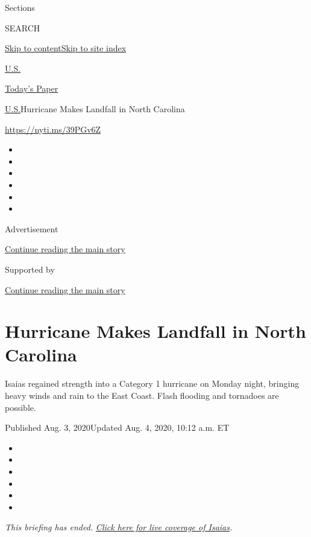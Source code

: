 Sections

SEARCH

\protect\hyperlink{site-content}{Skip to
content}\protect\hyperlink{site-index}{Skip to site index}

\href{https://www.nytimes.com/section/us}{U.S.}

\href{https://myaccount.nytimes.com/auth/login?response_type=cookie\&client_id=vi}{}

\href{https://www.nytimes.com/section/todayspaper}{Today's Paper}

\href{/section/us}{U.S.}\textbar{}Hurricane Makes Landfall in North
Carolina

\url{https://nyti.ms/39PGv6Z}

\begin{itemize}
\item
\item
\item
\item
\item
\item
\end{itemize}

Advertisement

\protect\hyperlink{after-top}{Continue reading the main story}

Supported by

\protect\hyperlink{after-sponsor}{Continue reading the main story}

\hypertarget{hurricane-makes-landfall-in-north-carolina}{%
\section{Hurricane Makes Landfall in North
Carolina}\label{hurricane-makes-landfall-in-north-carolina}}

Isaias regained strength into a Category 1 hurricane on Monday night,
bringing heavy winds and rain to the East Coast. Flash flooding and
tornadoes are possible.

Published Aug. 3, 2020Updated Aug. 4, 2020, 10:12 a.m. ET

\begin{itemize}
\item
\item
\item
\item
\item
\item
\end{itemize}

\emph{This briefing has ended.}
\href{https://www.nytimes.com/2020/08/04/us/isaias-storm-updates.html}{\emph{Click
here for live coverage of Isaias}}\emph{.}

